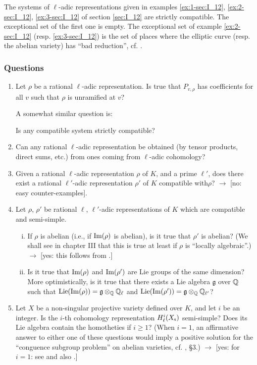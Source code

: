 \begin{ex}
The systems of $\ell$-adic representations given in examples \ref{ex:1-sec:I_12}, \ref{ex:2-sec:I_12}, \ref{ex:3-sec:I_12} of section \ref{sec:I_12} are strictly compatible. The exceptional set of the first one is empty. The exceptional set of example \ref{ex:2-sec:I_12} (resp. \ref{ex:3-sec:I_12}) is the set of places where the elliptic curve (resp. the abelian variety) has ``bad reduction'', cf. \cite{32}.
\end{ex}

\subsubsection*{Questions}
\begin{enumerate}
	\item Let $\rho$ be a rational $\ell$-adic representation. Is true that $P_{v,\rho}$ has coefficients for all $v$ such that $\rho$ is unramified at $v$?

A somewhat similar question is:

	Is any compatible system strictly compatible?
	\item Can any rational $\ell$-adic representation be obtained (by tensor products, direct sums, etc.) from ones coming from $\ell$-adic cohomology?
	\item Given a rational $\ell$-adic representation $\rho$ of $K$, and a prime $\ell'$, does there exist a rational $\ell'$-adic representation $\rho'$ of $K$ compatible with\break $\rho$? $\rightarrow$ [no: easy counter-examples].
	\item Let $\rho$, $\rho'$ be rational $\ell$, $\ell'$-adic representations of $K$ which are compatible and semi-simple.
	\begin{enumerate}[(i)]
		\item If $\rho$ is abelian (i.e., if $\operatorname{Im}(\rho)$ is abelian), is it true that $\rho'$ is abelian? (We shall see in chapter III that this is true at least if $\rho$ is ``locally algebraic''.) $\rightarrow$ [yes: this follows from \cite{36}.]
		\item Is it true that $\operatorname{Im}(\rho)$ and $\operatorname{Im}(\rho')$ are Lie groups of the
\dpage		
		same dimension? More optimistically, is it true that there exists a Lie algebra $\mathfrak{g}$ over $\mathbb{Q}$ such that $\operatorname{Lie}(\operatorname{Im}(\rho)) = \mathfrak{g} \otimes_{\mathbb{Q}} \mathbb{Q}_{\ell}$ and $\operatorname{Lie}(\operatorname{Im}(\rho')) = \mathfrak{g} \otimes_{\mathbb{Q}} \mathbb{Q}_{\ell'}$?
	\end{enumerate}
	\item Let $X$ be a non-singular projective variety defined over $K$, and
	let $i$ be an integer. Is the $i$-th cohomology representation $H_\ell^i(X_{\mathrm{s}})$ semi-simple? Does its Lie algebra contain the homotheties if $i\geq1$? (When $i=1$, an affirmative answer to either one of these questions would imply a positive solution for the ``conguence subgroup problem'' on abelian varieties, cf. \cite{24}, \S3.) $\rightarrow$ [yes: for $i=1$: see \cite{48} and also \cite{75}.]
\end{enumerate}

